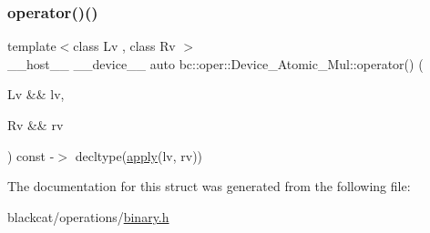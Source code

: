 \mbox{\label{structbc_1_1oper_1_1Device__Atomic__Mul_a570bce5f63941d93f759c4426713d849}} 
\subsubsection{\texorpdfstring{operator()()}{operator()()}}
{\footnotesize\ttfamily template$<$class Lv , class Rv $>$ \\
\+\_\+\+\_\+host\+\_\+\+\_\+ \+\_\+\+\_\+device\+\_\+\+\_\+ auto bc\+::oper\+::\+Device\+\_\+\+Atomic\+\_\+\+Mul\+::operator() (\begin{DoxyParamCaption}\item[{Lv \&\&}]{lv,  }\item[{Rv \&\&}]{rv }\end{DoxyParamCaption}) const -\/$>$ decltype(\hyperlink{structbc_1_1oper_1_1Device__Atomic__Mul_a6706742cf823f213808395c4449e62d8}{apply}(lv, rv)) \hspace{0.3cm}{\ttfamily [inline]}}



The documentation for this struct was generated from the following file\+:\begin{DoxyCompactItemize}
\item 
blackcat/operations/\hyperlink{binary_8h}{binary.\+h}\end{DoxyCompactItemize}

